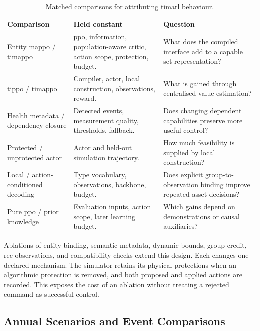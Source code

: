\begin{table}[htbp]
\centering
\small
\caption{Matched comparisons for attributing \gls{timarl} behaviour.}
\label{tab:timarl-structural-baselines}
\begin{tabularx}{\textwidth}{@{}p{}p{}X@{}}
\toprule
\textbf{Comparison} & \textbf{Held constant} & \textbf{Question}\\
\midrule
Entity \gls{mappo} / \gls{timappo} & \gls{ppo}, information, population-aware critic, action scope, protection, budget. & What does the compiled interface add to a capable set representation?\\
\addlinespace
\gls{tippo} / \gls{timappo} & Compiler, actor, local construction, observations, reward. & What is gained through centralised value estimation?\\
\addlinespace
Health metadata / dependency closure & Detected events, measurement quality, thresholds, fallback. & Does changing dependent capabilities preserve more useful control?\\
\addlinespace
Protected / unprotected actor & Actor and held-out simulation trajectory. & How much feasibility is supplied by local construction?\\
\addlinespace
Local / action-conditioned decoding & Type vocabulary, observations, backbone, budget. & Does explicit group-to-observation binding improve repeated-asset decisions?\\
\addlinespace
Pure \gls{ppo} / prior knowledge & Evaluation inputs, action scope, later learning budget. & Which gains depend on demonstrations or causal auxiliaries?\\
\bottomrule
\end{tabularx}
\end{table}

Ablations of entity binding, semantic metadata, dynamic bounds, group credit, \gls{rec} observations, and compatibility checks extend this design. Each changes one declared mechanism. The simulator retains its physical protections when an algorithmic protection is removed, and both proposed and applied actions are recorded. This exposes the cost of an ablation without treating a rejected command as successful control.

\subsection{Annual Scenarios and Event Comparisons}
\label{sec:timarl-scenarios}

